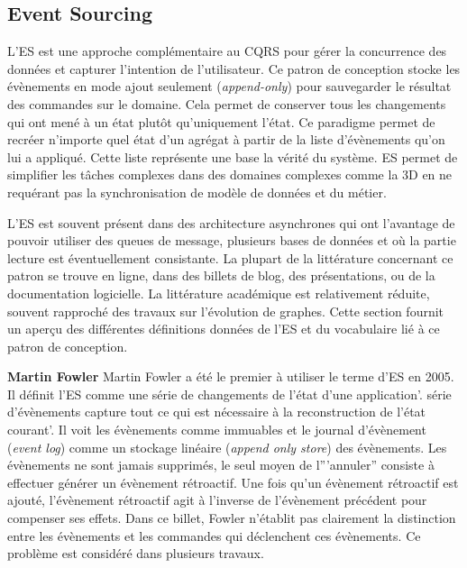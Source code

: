 \subsection{Event Sourcing}
\label{sec:es}
L'\gls{ES} est une approche complémentaire au \gls{CQRS} pour gérer la 
concurrence des données et capturer l'intention de l'utilisateur. Ce patron de 
conception stocke les évènements en mode ajout seulement 
(\textit{append-only}) pour sauvegarder le résultat des commandes sur le 
domaine. Cela permet de conserver tous les changements qui ont mené à un 
état plutôt qu'uniquement l'état. Ce paradigme permet de recréer n'importe quel 
état d'un agrégat à partir de la liste d'évènements qu'on lui a appliqué. Cette 
liste représente une base la vérité du système. 
\gls{ES} permet de simplifier les tâches complexes dans des 
domaines complexes comme la 3D en ne requérant pas la synchronisation de 
modèle de données et du métier. 

L'\gls{ES} est souvent présent dans des architecture asynchrones qui ont 
l'avantage de pouvoir utiliser des queues de message, plusieurs bases de 
données et où la partie lecture est éventuellement consistante.
La plupart de la littérature concernant ce patron se trouve en ligne, dans des 
billets de blog, des présentations, ou de la documentation logicielle. La 
littérature académique est relativement réduite, souvent rapproché des travaux 
sur l'évolution de graphes. Cette section fournit un aperçu des différentes 
définitions données de l'\gls{ES} et du vocabulaire lié à ce patron de conception.

\textbf{Martin Fowler} Martin Fowler a été le premier à utiliser le terme 
d'\acrlong{ES} en 2005. Il définit l'\gls{ES} comme \og une série de 
changements 
de l'état d'une application\fg{}'.  \og série d'évènements capture tout ce qui est 
nécessaire à la reconstruction de l'état courant'\fg{}. Il voit les évènements 
comme 
immuables et le journal d'évènement (\textit{event log}) comme un stockage 
linéaire (\textit{append only store}) des évènements. Les évènements ne sont 
jamais supprimés, le seul moyen de l'''annuler'' consiste à effectuer générer un 
évènement rétroactif. Une fois qu'un évènement rétroactif est ajouté, 
l'évènement 
rétroactif agit à l'inverse de l'évènement précédent pour compenser ses effets. 
Dans ce billet, Fowler n'établit pas clairement la distinction entre les 
évènements 
et les commandes qui déclenchent ces évènements. Ce problème est 
considéré 
dans plusieurs travaux.

